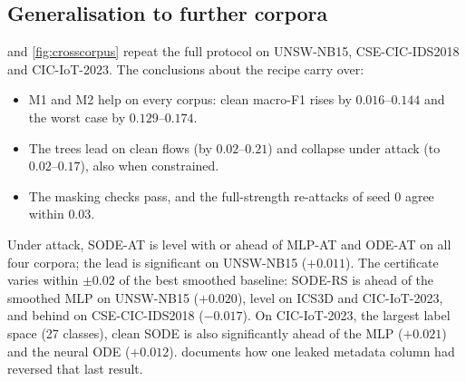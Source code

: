 \subsection{Generalisation to further corpora}
 and \cref{fig:crosscorpus} repeat the full protocol on
UNSW-NB15, CSE-CIC-IDS2018 and CIC-IoT-2023. The conclusions about the recipe carry over:
\begin{itemize}
\item M1 and M2 help on every corpus: clean macro-F1 rises by $0.016$--$0.144$ and
the worst case by $0.129$--$0.174$.
\item The trees lead on clean flows (by $0.02$--$0.21$) and collapse under attack
(to $0.02$--$0.17$), also when constrained.
\item The masking checks pass, and the full-strength re-attacks of seed 0 agree
within $0.03$.
\end{itemize}
Under attack, SODE-AT is level with or ahead of MLP-AT and ODE-AT on all four
corpora; the lead is significant on UNSW-NB15 ($+0.011$). The certificate
varies within $\pm0.02$ of the best smoothed baseline: SODE-RS is ahead of the
smoothed MLP on UNSW-NB15 ($+0.020$), level on ICS3D and CIC-IoT-2023, and behind on
CSE-CIC-IDS2018 ($-0.017$). On CIC-IoT-2023, the largest label space (27
classes), clean SODE is also significantly ahead of the MLP ($+0.021$) and the
neural ODE ($+0.012$).  documents how one leaked metadata
column had reversed that last result.

